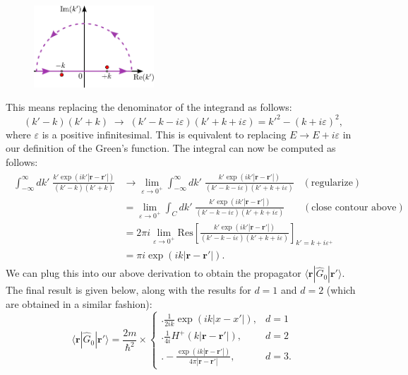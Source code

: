 \documentclass[pra,12pt]{revtex4}
\begin{document}
\begin{figure}[h!]
  \centering\includegraphics[width=0.4\textwidth]{greencontour}
\end{figure}

This means replacing the denominator of the integrand as
follows:
\begin{equation}
  (k' - k)(k'+k) \;\rightarrow\; (k' - k - i\varepsilon)(k'+k+i\varepsilon) = {k'}^2 - (k+i\varepsilon)^2,
\end{equation}
where $\varepsilon$ is a positive infinitesimal.  This is equivalent
to replacing $E \rightarrow E + i\varepsilon$ in our definition of the
Green's function.  The integral can now be computed as
follows:
\begin{align}
  \begin{aligned}\int_{-\infty}^\infty dk' \; \frac{\displaystyle k' \exp\left(ik'|\mathbf{r}-\mathbf{r}'|\right)}{(k' - k)(k'+k)} &\rightarrow \lim_{\varepsilon \rightarrow 0^+} \int_{-\infty}^\infty dk' \; \frac{\displaystyle k' \exp\left(ik'|\mathbf{r}-\mathbf{r}'|\right)}{(k' - k - i\varepsilon)(k'+k+i\varepsilon)}\;\;\; (\text{regularize}) \\ &= \lim_{\varepsilon \rightarrow 0^+} \int_C dk' \; \frac{\displaystyle k' \exp\left(ik'|\mathbf{r}-\mathbf{r}'|\right)}{(k' - k - i\varepsilon)(k'+k+i\varepsilon)} \quad\;\;\; (\text{close contour above}) \\ &= 2\pi i \lim_{\varepsilon \rightarrow 0^+} \mathrm{Res}\left[\frac{\displaystyle k' \exp\left(ik'|\mathbf{r}-\mathbf{r}'|\right)}{(k' - k - i\varepsilon)(k'+k+i\varepsilon)}\right]_{k'=k+i\varepsilon^+} \\ &= \pi i \exp\left(ik|\mathbf{r}-\mathbf{r}'|\right).\end{aligned}
\end{align}
We can plug this into our above derivation to obtain the propagator
$\langle\mathbf{r}|\hat{G}_0|\mathbf{r}'\rangle$.  The final result is
given below, along with the results for $d=1$ and $d=2$ (which are
obtained in a similar fashion):
$$\boxed{\;\;\;\langle\mathbf{r}|\hat{G}_0|\mathbf{r}'\rangle = \frac{2m}{\hbar^2} \times \begin{cases} \Bigg.\displaystyle\frac{1}{2ik} \exp\left(ik|x-x'|\right),& d=1\\ \Bigg. \displaystyle\frac{1}{4i} H^+(k|\mathbf{r}-\mathbf{r'}|), & d=2 \\ \displaystyle \Bigg. - \frac{\exp\left(ik|\mathbf{r}-\mathbf{r}'|\right)}{4\pi|\mathbf{r}-\mathbf{r}'|}, & d = 3.  \end{cases}\;\;\;}$$
\end{document}
